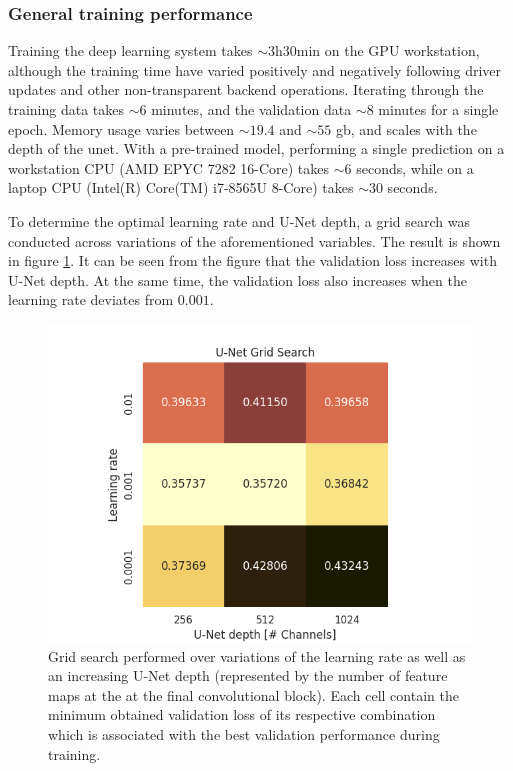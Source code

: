\documentclass[../main/thesis]{subfiles}
\begin{document}
\subsubsection{General training performance}
Training the deep learning system takes $\sim 3\text{h}30\text{min}$ on the GPU workstation, although the training time have varied positively and negatively following driver updates and other non-transparent backend operations. Iterating through the training data takes $\sim 6$ minutes, and the validation data $\sim 8$ minutes for a single epoch. Memory usage varies between $\sim19.4$ and $\sim55$ gb, and scales with the depth of the unet. With a pre-trained model, performing a single prediction on a workstation CPU (AMD EPYC 7282 16-Core) takes $\sim 6$ seconds, while on a laptop CPU (Intel(R) Core(TM) i7-8565U 8-Core) takes $\sim 30$ seconds.

To determine the optimal learning rate and U-Net depth, a grid search was conducted across variations of the aforementioned variables. The result is shown in figure \ref{fig:gs}. It can be seen from the figure that the validation loss increases with U-Net depth. At the same time, the validation loss also increases when the learning rate deviates from $0.001$.

\begin{figure}
    \centering
    \includegraphics[width=.8\textwidth]{grid_search}
    \caption{\label{fig:gs}Grid search performed over variations of the learning rate as well as an increasing U-Net depth (represented by the number of feature maps at the at the final convolutional block). Each cell contain the minimum obtained validation loss of its respective combination which is associated with the best validation performance during training.}
\end{figure}
\end{document}

